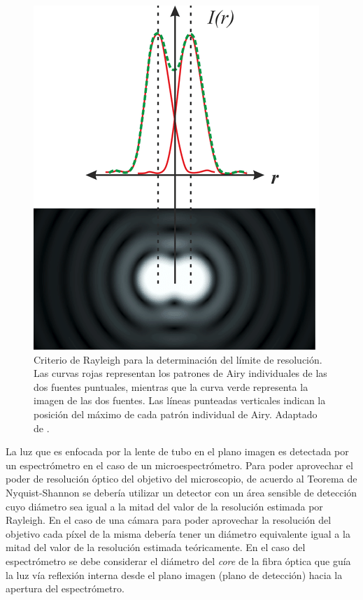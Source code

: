 \begin{figure}[H]
	\centering
	\includegraphics[scale=0.6]{Figs/microespectrometro/raylspa.png}
	\caption{Criterio de Rayleigh para la determinación del límite de resolución. Las curvas rojas representan los patrones de Airy individuales de las dos fuentes puntuales, mientras que la curva verde representa la imagen de las dos fuentes. Las líneas punteadas verticales indican la posición del máximo de cada patrón individual de Airy. Adaptado de \cite{raylsp}.}
	\label{fig:critrayspa}
\end{figure}

La luz que es enfocada por la lente de tubo en el plano imagen es detectada por un espectrómetro en el caso de un microespectrómetro. Para poder aprovechar el poder de resolución óptico del objetivo del microscopio, de acuerdo al Teorema de Nyquist-Shannon se debería utilizar un detector con un área sensible de detección cuyo diámetro sea igual a la mitad del valor de la resolución estimada por Rayleigh. En el caso de una cámara para poder aprovechar la resolución del objetivo cada píxel de la misma debería tener un diámetro equivalente igual a la mitad del valor de la resolución estimada teóricamente. En el caso del espectrómetro se debe considerar el diámetro del \textit{core} de la fibra óptica que guía la luz vía reflexión interna desde el plano imagen (plano de detección) hacia la apertura del espectrómetro.

